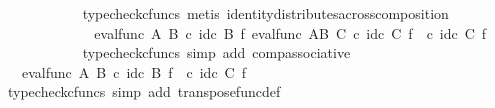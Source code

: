 \begin{isabellebody}
\ \ \ \ \ \ \ \ \ \ \isamarkupfalse%
\ {\isacharparenleft}{\kern0pt}typecheck{\isacharunderscore}{\kern0pt}cfuncs{\isacharcomma}{\kern0pt}\ metis\ identity{\isacharunderscore}{\kern0pt}distributes{\isacharunderscore}{\kern0pt}across{\isacharunderscore}{\kern0pt}composition{\isacharparenright}{\kern0pt}\isanewline
\ \ \ \ \ \ \ \ \isamarkupfalse%
\ \isamarkupfalse%
\ {\isachardoublequoteopen}{\isachardot}{\kern0pt}{\isachardot}{\kern0pt}{\isachardot}{\kern0pt}\ {\isacharequal}{\kern0pt}\ eval{\isacharunderscore}{\kern0pt}func\ A\ B\ {\isasymcirc}\isactrlsub c\ id\isactrlsub c\ B\ {\isasymtimes}\isactrlsub f\ {\isacharparenleft}{\kern0pt}{\isacharparenleft}{\kern0pt}eval{\isacharunderscore}{\kern0pt}func\ {\isacharparenleft}{\kern0pt}A\isactrlbsup B\isactrlesup {\isacharparenright}{\kern0pt}\ C\ {\isasymcirc}\isactrlsub c\ {\isacharparenleft}{\kern0pt}id\isactrlsub c\ C\ {\isasymtimes}\isactrlsub f\ {\isasymphi}\isactrlsup {\isasymsharp}\isactrlsup {\isasymsharp}{\isacharparenright}{\kern0pt}{\isacharparenright}{\kern0pt}\ {\isasymcirc}\isactrlsub c\ {\isacharparenleft}{\kern0pt}id\isactrlsub c\ C\ {\isasymtimes}\isactrlsub f\ {\isasympsi}\isactrlsup {\isasymsharp}{\isacharparenright}{\kern0pt}{\isacharparenright}{\kern0pt}{\isachardoublequoteclose}\isanewline
\ \ \ \ \ \ \ \ \ \ \isamarkupfalse%
\ {\isacharparenleft}{\kern0pt}typecheck{\isacharunderscore}{\kern0pt}cfuncs{\isacharcomma}{\kern0pt}\ simp\ add{\isacharcolon}{\kern0pt}\ comp{\isacharunderscore}{\kern0pt}associative{}{\isacharparenright}{\kern0pt}\isanewline
\ \ \ \ \ \ \ \ \isamarkupfalse%
\ \isamarkupfalse%
\ {\isachardoublequoteopen}{\isachardot}{\kern0pt}{\isachardot}{\kern0pt}{\isachardot}{\kern0pt}\ {\isacharequal}{\kern0pt}\ eval{\isacharunderscore}{\kern0pt}func\ A\ B\ {\isasymcirc}\isactrlsub c\ id\isactrlsub c\ B\ {\isasymtimes}\isactrlsub f\ {\isacharparenleft}{\kern0pt}{\isasymphi}\isactrlsup {\isasymsharp}\ {\isasymcirc}\isactrlsub c\ {\isacharparenleft}{\kern0pt}id\isactrlsub c\ C\ {\isasymtimes}\isactrlsub f\ {\isasympsi}\isactrlsup {\isasymsharp}{\isacharparenright}{\kern0pt}{\isacharparenright}{\kern0pt}{\isachardoublequoteclose}\isanewline
\ \ \ \ \ \ \ \ \ \ \isamarkupfalse%
\ {\isacharparenleft}{\kern0pt}typecheck{\isacharunderscore}{\kern0pt}cfuncs{\isacharcomma}{\kern0pt}\ simp\ add{\isacharcolon}{\kern0pt}\ transpose{\isacharunderscore}{\kern0pt}func{\isacharunderscore}{\kern0pt}def{\isacharparenright}{\kern0pt}\ \ \ \ \ \ \ \ \isanewline
\ \ \ \ \ \ \ \ \isamarkupfalse%

\end{isabellebody}
